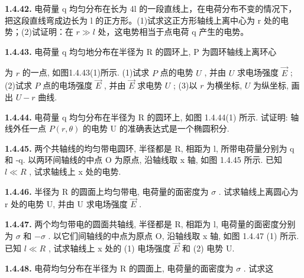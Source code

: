 \vfill

\textbf{1.4.42.} 电荷量 q 均匀分布在长为 4l 的一段直线上，在电荷分布不变的情况下，把这段直线弯成边长为 l 的正方形。(1)试求这正方形轴线上离中心为 r 处的电势；(2)试证明：在 $r \gg l$ 处，这电势相当于点电荷 q 产生的电势。

\vfill

\newpage
\textbf{1.4.43.} 电荷量 q 均匀地分布在半径为 R 的圆环上, P 为圆环轴线上离环心


为 $r$ 的一点, 如图1.4.43(1)所示. (1)试求 $P$ 点的电势 $U$ , 并由 $U$ 求电场强度 $\vec{E}$ ; (2)试求 $P$ 点的电场强度 $\vec{E}$ , 并由 $\vec{E}$ 求电势 $U$ ; (3)以 $r$ 为横坐标, $U$ 为纵坐标, 画出 $U - r$ 曲线.

\begin{center}
\end{center}

\vfill

\textbf{1.4.44.} 电荷量 q 均匀分布在半径为 R 的圆环上, 如图 1.4.44(1) 所示. 试证明: 轴线外任一点 $P(r, \theta)$ 的电势 U 的准确表达式是一个椭圆积分.



\begin{center}
\end{center}


\vfill

\newpage
\textbf{1.4.45.} 两个共轴线的均匀带电圆环, 半径都是 R, 相距为 l, 所带电荷量分别为 q 和 -q. 以两环间轴线的中点 O 为原点, 沿轴线取 x 轴, 如图 1.4.45 所示. 已知 $l \ll R$ , 试求轴线上 x 处的电势.

\vfill

\textbf{1.4.46.} 半径为 R 的圆面上均匀带电, 电荷量的面密度为 $\sigma$ . 试求轴线上离圆心为 r 处的电势 U, 并由 U 求电场强度 $\vec{E}$ .

\vfill

\newpage
\textbf{1.4.47.} 两个均匀带电的圆面共轴线, 半径都是 R, 相距为 l, 电荷量的面密度分别为 $\sigma$ 和 $-\sigma$ . 以它们间轴线的中点为原点 O, 沿轴线取 x 轴, 如图 1.4.47 (1) 所示. 已知 $l \ll R$ , 试求轴线上 x 处的 (1) 电场强度 $\vec{E}$ 和 (2) 电势 U.



\begin{center}
\end{center}


\vfill

\textbf{1.4.48.} 电荷均匀分布在半径为 R 的圆面上, 电荷量的面密度为 $\sigma$ . 试求这


